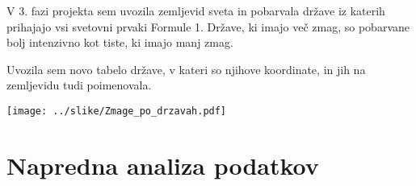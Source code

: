 \documentclass[11pt,a4paper]{article}
\begin{document}
V 3. fazi projekta sem uvozila zemljevid sveta in pobarvala države iz katerih prihajajo vsi svetovni prvaki Formule 1. Države, ki imajo več zmag, so pobarvane bolj intenzivno kot tiste, ki imajo manj zmag. 

Uvozila sem novo tabelo države, v kateri so njihove koordinate, in jih na zemljevidu tudi poimenovala.

\texttt{[image: ../slike/Zmage\_po\_drzavah.pdf]}

\section{Napredna analiza podatkov}

\end{document}
